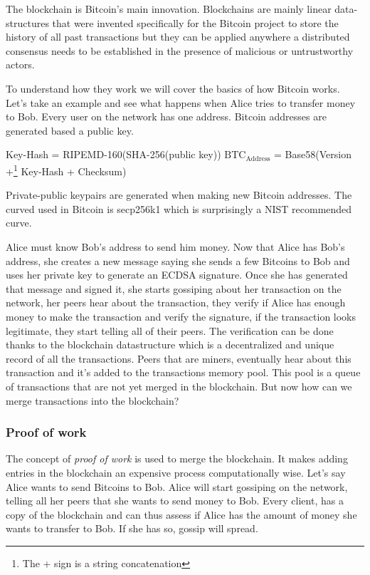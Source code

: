 \documentclass{vldb}
\begin{document}
The blockchain is Bitcoin's main innovation. Blockchains are mainly linear data-structures that were invented specifically for the Bitcoin project to store the history of all past transactions but they can be applied anywhere a distributed consensus needs to be established in the presence of malicious or untrustworthy actors.

To understand how they work we will cover the basics of how Bitcoin works. Let's take an example and see what happens when Alice tries to transfer money to Bob. Every user on the network has one address. Bitcoin addresses are generated based a public key. 
\begin{center}
Key-Hash = RIPEMD-160(SHA-256(public key))
$\text{BTC}_{\text{Address}}$ = Base58(Version +\footnote{The + sign is a string concatenation} Key-Hash + Checksum)
\end{center}

Private-public keypairs are generated when making new Bitcoin addresses. The curved used in Bitcoin is secp256k1 which is surprisingly a NIST recommended curve.\cite{VOID}

Alice must know Bob's address to send him money. Now that Alice has Bob's address, she creates a new message saying she sends a few Bitcoins to Bob and uses her private key to generate an ECDSA signature. Once she has generated that message and signed it, she starts gossiping about her transaction on the network, her peers hear about the transaction, they verify if Alice has enough money to make the transaction and verify the signature, if the transaction looks legitimate, they start telling all of their peers. The verification can be done thanks to the blockchain datastructure which is a decentralized and unique record of all the transactions. Peers that are miners, eventually hear about this transaction and it's added to the transactions memory pool. This pool is a queue of transactions that are not yet merged in the blockchain. But now how can we merge transactions into the blockchain? 

\subsubsection{Proof of work}

The concept of \emph{proof of work} is used to merge the blockchain. It makes adding entries in the blockchain an expensive process computationally wise. Let's say Alice wants to send Bitcoins to Bob. Alice will start gossiping on the network, telling all her peers that she wants to send money to Bob. Every client, has a copy of the blockchain and can thus assess if Alice has the amount of money she wants to transfer to Bob. If she has so, gossip will spread.
\end{document}
